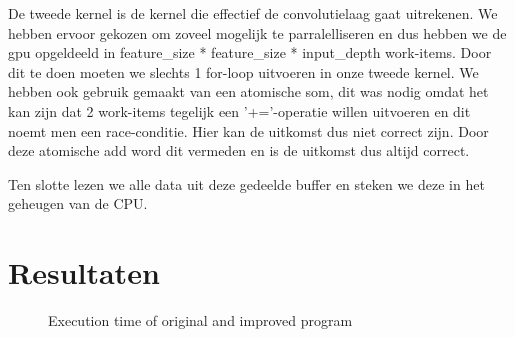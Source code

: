 \documentclass[a4paper, 12pt, one column]{article}
\begin{document}
\noindent
De tweede kernel is de kernel die effectief de convolutielaag gaat uitrekenen. We hebben ervoor gekozen om zoveel mogelijk te 
parralelliseren en dus hebben we de gpu opgeldeeld in feature_size * feature_size * input_depth work-items.
Door dit te doen moeten we slechts 1 for-loop uitvoeren in onze tweede kernel. 
We hebben ook gebruik gemaakt van een atomische som, dit was nodig omdat het kan zijn dat 2 work-items tegelijk een '+='-operatie
willen uitvoeren en dit noemt men een race-conditie. Hier kan de uitkomst dus niet correct zijn. Door deze atomische add word dit 
vermeden en is de uitkomst dus altijd correct.

\noindent
Ten slotte lezen we alle data uit deze gedeelde buffer en steken we deze in het geheugen van de CPU.

\section{Resultaten}

\begin{figure}
  \centering
  \caption{Execution time of original and improved program}
  \label{general}
\end{figure}
\end{document}
